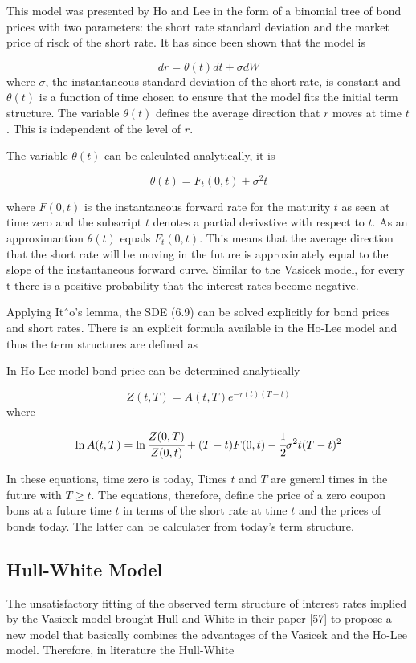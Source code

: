 This model was presented by Ho and Lee in the form of a binomial tree of
bond prices with two parameters: the short rate standard deviation and
the market price of risck of the short rate. It has since been shown
that the model is

\[dr=\theta(t)dt +\sigma dW\]
where \(\sigma\), the instantaneous standard deviation of the short
rate, is constant and \(\theta(t)\) is a function of time chosen to
ensure that the model fits the initial term structure.
The variable
\(\theta(t)\) defines the average direction that \(r\) moves at time
\(t\). This is independent of the level of \(r\).

The variable \(\theta(t)\) can be calculated analytically, it is

\[\theta(t)=F_t(0, t) + \sigma^2 t\]

where \(F(0, t)\) is the instantaneous forward rate for the maturity
\(t\) as seen at time zero and the subscript \(t\) denotes a partial
derivstive with respect to \(t\). As an approximantion \(\theta(t)\)
equals \(F_t(0, t)\). This means that the average direction that the
short rate will be moving in the future is approximately equal to the
slope of the instantaneous forward curve.
Similar to the Vasicek model, for every t there is a positive probability that the interest rates become negative.

Applying Itˆo’s lemma, the SDE (6.9) can be solved explicitly for bond prices and short rates. There is an explicit formula available in the Ho-Lee model and thus the term structures are defined as

In Ho-Lee model bond price can be determined analytically

\[Z(t, T)=A(t, T)e^{-r(t)(T-t)}\]
where

\[\ln A(t, T)=\ln\cfrac{Z(0,T)}{Z(0,t)}+(T-t)F(0,t)-\cfrac{1}{2}\sigma^2 t(T-t)^2\]

In these equations, time zero is today, Times \(t\) and \(T\) are
general times in the future with \(T\geq t\). The equations, therefore,
define the price of a zero coupon bons at a future time \(t\) in terms
of the short rate at time \(t\) and the prices of bonds today. The
latter can be calculater from today's term structure.

\subsection{Hull-White Model}
\label{hull-white-model}
The unsatisfactory fitting of the observed term structure of interest rates implied by the Vasicek model brought Hull and White in their paper [57] to propose a new model that basically combines the advantages of the Vasicek and the Ho-Lee model. Therefore, in literature the Hull-White

